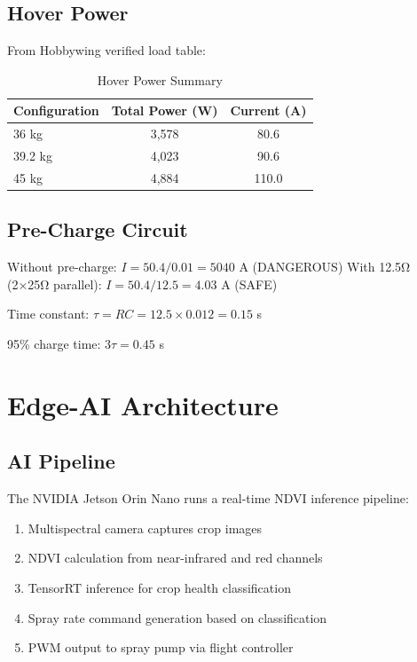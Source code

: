 \documentclass[12pt,a4paper]{article}
\begin{document}
\subsection{Hover Power}
From Hobbywing verified load table:
\begin{table}[H]
\centering
\caption{Hover Power Summary}
\begin{tabular}{lcc}
\toprule
Configuration & Total Power (W) & Current (A) \\
\midrule
36 kg & 3,578 & 80.6 \\
39.2 kg & 4,023 & 90.6 \\
45 kg & 4,884 & 110.0 \\
\bottomrule
\end{tabular}
\end{table}

\subsection{Pre-Charge Circuit}
Without pre-charge: $I = 50.4/0.01 = 5040$ A (DANGEROUS)
With 12.5Ω (2×25Ω parallel): $I = 50.4/12.5 = 4.03$ A (SAFE)

Time constant: $\tau = RC = 12.5 \times 0.012 = 0.15$ s

95\% charge time: $3\tau = 0.45$ s

\section{Edge-AI Architecture}

\subsection{AI Pipeline}
The NVIDIA Jetson Orin Nano runs a real-time NDVI inference pipeline:
\begin{enumerate}
    \item Multispectral camera captures crop images
    \item NDVI calculation from near-infrared and red channels
    \item TensorRT inference for crop health classification
    \item Spray rate command generation based on classification
    \item PWM output to spray pump via flight controller
\end{enumerate}
\end{document}
